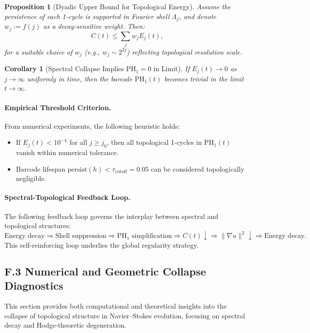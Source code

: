 \documentclass[11pt]{article}
\newtheorem{proposition}[theorem]{Proposition}
\newtheorem{corollary}[theorem]{Corollary}
\theoremstyle{definition}
\begin{document}
\begin{proposition}[Dyadic Upper Bound for Topological Energy]
Assume the persistence of each 1-cycle is supported in Fourier shell \( \Lambda_j \), and denote
\( w_j := f(j) \) as a decay-sensitive weight. Then:
\[ 
C(t) \leq \sum_j w_j E_j(t),
\]
for a suitable choice of \( w_j \) (e.g., \( w_j \sim 2^{2j} \)) reflecting topological resolution scale.
\end{proposition}

\begin{corollary}[Spectral Collapse Implies \( \mathrm{PH}_1 = 0 \) in Limit]
If \( E_j(t) \to 0 \) as \( j \to \infty \) uniformly in time, then the barcode \( \mathrm{PH}_1(t) \) becomes trivial in the limit
\( t \to \infty \).
\end{corollary}

\paragraph{Empirical Threshold Criterion.} From numerical experiments, the following heuristic holds:
\begin{itemize}
  \item If \( E_j(t) < 10^{-4} \) for all \( j \geq j_0 \), then all topological 1-cycles in \( \mathrm{PH}_1(t) \) vanish within numerical tolerance.
  \item Barcode lifespan \( \text{persist}(h) < \tau_{\text{cutoff}} = 0.05 \) can be considered topologically negligible.
\end{itemize}

\paragraph{Spectral-Topological Feedback Loop.} The following feedback loop governs the interplay between spectral and topological structures:
\[ 
\text{Energy decay} \Rightarrow \text{Shell suppression} \Rightarrow \mathrm{PH}_1 \text{ simplification} \Rightarrow C(t) \downarrow \Rightarrow \|\nabla u\|^2 \downarrow \Rightarrow \text{Energy decay}.
\]
This self-reinforcing loop underlies the global regularity strategy.



\subsection*{F.3 Numerical and Geometric Collapse Diagnostics}

This section provides both computational and theoretical insights  
into the collapse of topological structure in Navier–Stokes evolution,  
focusing on spectral decay and Hodge-theoretic degeneration.
\end{document}
